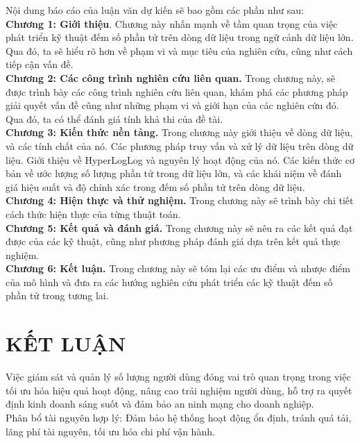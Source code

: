 \documentclass[letterpaper,13pt]{article}
\theoremstyle{mytheor}
\begin{document}
Nội dung báo cáo của luận văn dự kiến sẽ bao gồm các phần như sau:\\

\textbf{Chương 1: Giới thiệu}. Chương này nhấn mạnh về tầm quan trọng của việc phát triển kỹ thuật đếm số phần tử trên dòng dữ liệu trong ngữ cảnh 
dữ liệu lớn. Qua đó, ta sẽ hiểu rõ hơn về phạm vi và mục tiêu của nghiên cứu, cũng như cách tiếp cận vấn đề.\\

\textbf{Chương 2: Các công trình nghiên cứu liên quan.} Trong chương này, sẽ được trình bày các công trình nghiên cứu liên quan, khám phá các 
phương pháp giải quyết vấn đề cũng như những phạm vi và giới hạn của các nghiên cứu đó. Qua đó, ta có thể đánh giá tính khả thi của đề tài.\\

\textbf{Chương 3: Kiến thức nền tảng.} Trong chương này giới thiệu về dòng dữ liệu, và các tính chất của nó.
Các phương pháp truy vấn và xử lý dữ liệu trên dòng dữ liệu. Giới thiệu về HyperLogLog và nguyên lý hoạt động của nó. Các kiến thức cơ bản về ước lượng số lượng phần tử trong dữ liệu lớn,
và các khái niệm về đánh giá hiệu suất và độ chính xác trong đếm số phần tử trên dòng dữ liệu.\\

\textbf{Chương 4: Hiện thực và thử nghiệm. } Trong chương này sẽ trình bày chi tiết cách thức hiện thực của từng thuật toán.\\

\textbf{Chương 5: Kết quả và đánh giá.} Trong chương này sẽ nêu ra các kết quả đạt được của các kỹ thuật, cũng như phương pháp đánh giá 
dựa trên kết quả thực nghiệm.\\

\textbf{Chương 6: Kết luận.} Trong chương này sẽ tóm lại các ưu điểm và nhược điểm của mô hình và đưa ra các hướng nghiên cứu phát triển 
các kỹ thuật đếm số phần tử trong tương lai.\\
\newpage
\section{KẾT LUẬN}
Việc giám sát và quản lý số lượng người dùng đóng vai trò quan trọng trong việc tối ưu hóa hiệu quả hoạt động, 
nâng cao trải nghiệm người dùng, hỗ trợ ra quyết định kinh doanh sáng suốt và đảm bảo an ninh mạng cho doanh nghiệp.\\

Phân bổ tài nguyên hợp lý: Đảm bảo hệ thống hoạt động ổn định, tránh quá tải, lãng phí tài nguyên, tối ưu hóa chi phí vận hành.\\
\end{document}
